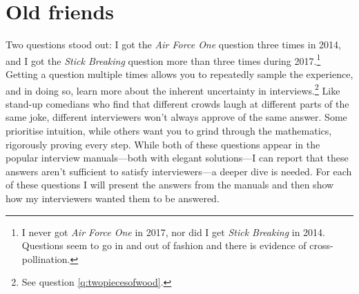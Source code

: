 \documentclass[a4paper]{article}
\begin{document}
\clearpage


\clearpage
\section{Old friends}
Two questions stood out:
I got the \emph{Air Force One} question three times in 2014, and I got the \emph{Stick Breaking} question more than three times during 2017.\footnote{I never got \emph{Air Force One} in 2017, nor did I get \emph{Stick Breaking} in 2014. Questions seem to go in and out of fashion and there is evidence of cross-pollination.}
Getting a question multiple times allows you to repeatedly sample the experience, and in doing so, learn more about the inherent uncertainty in interviews.\footnote{See question \ref{q:twopiecesofwood}.}
Like stand-up comedians who find that different crowds laugh at different parts of the same joke, different interviewers won't always approve of the same answer.
Some prioritise intuition, while others want you to grind through the mathematics, rigorously proving every step.
While both of these questions appear in the popular interview manuals---both with elegant solutions---I can report that these answers aren't sufficient to satisfy interviewers---a deeper dive is needed.
For each of these questions I will present the answers from the manuals and then show how my interviewers wanted them to be answered.
\end{document}
